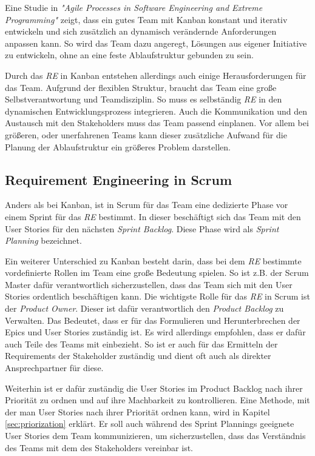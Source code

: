 \documentclass[acmtog]{acmart}
\begin{document}
Eine Studie in \emph{"Agile Processes in Software Engineering and Extreme Programming"} \cite{agileprocesses} zeigt, dass ein gutes Team mit Kanban konstant und iterativ entwickeln und sich zusätzlich
an dynamisch verändernde Anforderungen anpassen kann. So wird das Team dazu angeregt, Lösungen aus eigener
Initiative zu entwickeln, ohne an eine feste Ablaufstruktur gebunden zu sein. \cite{reqkanban}

Durch das \emph{RE} in Kanban entstehen allerdings auch einige Herausforderungen für das Team. Aufgrund der flexiblen
Struktur, braucht das Team eine große Selbstverantwortung und Teamdisziplin. So muss es selbständig \emph{RE} in den
dynamischen Entwicklungsprozess integrieren. Auch die Kommunikation und den Austausch mit den Stakeholders muss
das Team passend einplanen. Vor allem bei größeren, oder unerfahrenen Teams kann dieser zusätzliche Aufwand für
die Planung der Ablaufstruktur ein größeres Problem darstellen. \cite{kanbannod}

\subsection{Requirement Engineering in Scrum}

Anders als bei Kanban, ist in Scrum für das Team eine dedizierte Phase vor einem Sprint für das \emph{RE} bestimmt. In dieser
beschäftigt sich das Team mit den User Stories für den nächsten \emph{Sprint Backlog}. Diese Phase wird als \emph{Sprint Planning} bezeichnet. \cite{reinscrum}

Ein weiterer Unterschied zu Kanban besteht darin, dass bei dem \emph{RE} bestimmte vordefinierte Rollen im Team eine
große Bedeutung spielen. So ist z.B. der Scrum Master dafür verantwortlich sicherzustellen, dass das Team sich mit den
User Stories ordentlich beschäftigen kann. Die wichtigste Rolle für das \emph{RE} in Scrum ist der \emph{Product Owner}. Dieser ist
dafür verantwortlich den \emph{Product Backlog} zu Verwalten. Das Bedeutet, dass er für das Formulieren und Herunterbrechen der
Epics und User Stories zuständig ist. Es wird allerdings empfohlen, dass er dafür auch Teile des Teams mit einbezieht. So ist er auch für
das Ermitteln der Requirements der Stakeholder zuständig und dient oft auch als direkter Ansprechpartner für diese. \cite{reinscrum}

Weiterhin ist er dafür zuständig die User Stories im Product Backlog nach ihrer Priorität zu ordnen und auf ihre Machbarkeit
zu kontrollieren. Eine Methode, mit der man User Stories nach ihrer Priorität ordnen kann, wird in Kapitel \ref{sec:priorization} erklärt.
Er soll auch während des Sprint Plannings geeignete User Stories dem Team kommunizieren, um sicherzustellen, dass das Verständnis
des Teams mit dem des Stakeholders vereinbar ist. \cite{reinscrum}
\end{document}
